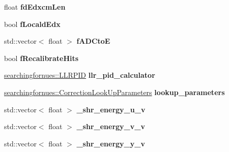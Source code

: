\begin{DoxyCompactItemize}
\item 
float {\bfseries fd\+Edxcm\+Len}\hypertarget{classanalysis_1_1ShowerAnalysis_a2e56492daf7133eb5243653389fe98c6}{}\label{classanalysis_1_1ShowerAnalysis_a2e56492daf7133eb5243653389fe98c6}

\item 
bool {\bfseries f\+Locald\+Edx}\hypertarget{classanalysis_1_1ShowerAnalysis_ae952c38c8393682df6d40b1bcca95ba5}{}\label{classanalysis_1_1ShowerAnalysis_ae952c38c8393682df6d40b1bcca95ba5}

\item 
std\+::vector$<$ float $>$ {\bfseries f\+A\+D\+CtoE}\hypertarget{classanalysis_1_1ShowerAnalysis_a4d28c910965169cee42bc4dbbe7b54ef}{}\label{classanalysis_1_1ShowerAnalysis_a4d28c910965169cee42bc4dbbe7b54ef}

\item 
bool {\bfseries f\+Recalibrate\+Hits}\hypertarget{classanalysis_1_1ShowerAnalysis_a329daaca59960295d059deca59dbc406}{}\label{classanalysis_1_1ShowerAnalysis_a329daaca59960295d059deca59dbc406}

\item 
\hyperlink{classsearchingfornues_1_1LLRPID}{searchingfornues\+::\+L\+L\+R\+P\+ID} {\bfseries llr\+\_\+pid\+\_\+calculator}\hypertarget{classanalysis_1_1ShowerAnalysis_a6069560df2516066372a8217f0dc8d0b}{}\label{classanalysis_1_1ShowerAnalysis_a6069560df2516066372a8217f0dc8d0b}

\item 
\hyperlink{structsearchingfornues_1_1CorrectionLookUpParameters}{searchingfornues\+::\+Correction\+Look\+Up\+Parameters} {\bfseries lookup\+\_\+parameters}\hypertarget{classanalysis_1_1ShowerAnalysis_a706a700261c4f0050b89cde711c359d2}{}\label{classanalysis_1_1ShowerAnalysis_a706a700261c4f0050b89cde711c359d2}

\item 
std\+::vector$<$ float $>$ {\bfseries \+\_\+shr\+\_\+energy\+\_\+u\+\_\+v}\hypertarget{classanalysis_1_1ShowerAnalysis_a0aae9ad74279a378774ca23acf1e0d39}{}\label{classanalysis_1_1ShowerAnalysis_a0aae9ad74279a378774ca23acf1e0d39}

\item 
std\+::vector$<$ float $>$ {\bfseries \+\_\+shr\+\_\+energy\+\_\+v\+\_\+v}\hypertarget{classanalysis_1_1ShowerAnalysis_a1b6590c13db0591057e62aa7dc3b5325}{}\label{classanalysis_1_1ShowerAnalysis_a1b6590c13db0591057e62aa7dc3b5325}

\item 
std\+::vector$<$ float $>$ {\bfseries \+\_\+shr\+\_\+energy\+\_\+y\+\_\+v}\hypertarget{classanalysis_1_1ShowerAnalysis_a9052a49fa94e24eaaa54835367cdfb90}{}\label{classanalysis_1_1ShowerAnalysis_a9052a49fa94e24eaaa54835367cdfb90}


\end{DoxyCompactItemize}
